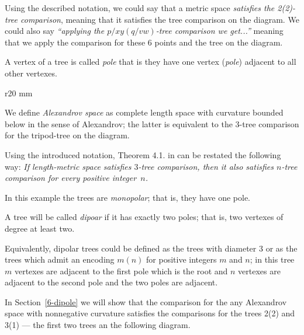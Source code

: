 Using the described notation, we could say that a metric space \emph{satisfies the 2(2)-tree comparison},  meaning that it satisfies the tree comparison on the diagram.
We could also say \emph{``applying the $p/xy(q/vw)$-tree comparison we get...''} meaning that we apply the comparison for these 6 points and the tree on the diagram.

A vertex of a tree is called \emph{pole}
that is they have one vertex (\emph{pole}) adjacent to all other vertexes.

\hide
\begin{wrapfigure}{r}{20 mm}
\end{wrapfigure}
\unhide

We define \emph{Alexandrov space} as complete length space with curvature bounded below in the sense of Alexandrov;
the latter is equivalent to the 3-tree comparison for the tripod-tree on the diagram. 

Using the introduced notation, Theorem 4.1. in \cite{AKP} can be restated the following way: \emph{If length-metric space satisfies $3$-tree comparison, then it also satisfies $n$-tree comparison for every positive integer~$n$.}

In this example the trees are \emph{monopolar};
that is, they have one pole.

A tree will be called \emph{dipoar} if it has exactly two poles;
that is, two vertexes of degree at least two.

Equivalently, dipolar trees could be defined as the trees with diameter 3
or as the trees which admit an encoding $m(n)$ for positive integers $m$ and $n$; 
in this tree $m$ vertexes are adjacent to the first pole which is the root
and $n$ vertexes are adjacent to the second pole and the two poles are adjacent.

In Section~\ref{6-dipole} we will show that the comparison for the any Alexandrov space with nonnegative curvature satisfies the comparisons for the trees 2(2) and 3(1) --- the first two trees an the following diagram.

